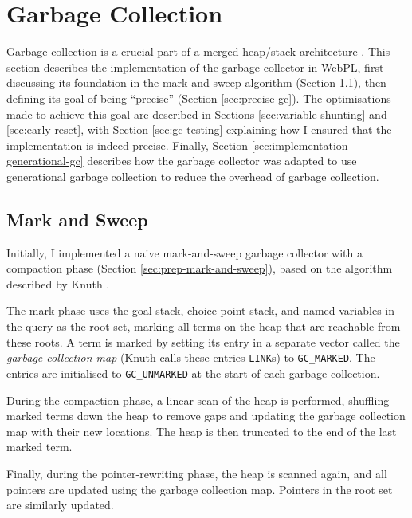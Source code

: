 \section{Garbage Collection}

\label{sec:gc-impl}

Garbage collection is a crucial part of a merged heap/stack architecture \cite{liEfficientMemoryManagement2000}. This section describes the implementation of the garbage collector in WebPL, first discussing its foundation in the mark-and-sweep algorithm (Section \ref{sec:mark-and-sweep}), then defining its goal of being ``precise'' (Section \ref{sec:precise-gc}). The optimisations made to achieve this goal are described in Sections \ref{sec:variable-shunting} and \ref{sec:early-reset}, with Section \ref{sec:gc-testing} explaining how I ensured that the implementation is indeed precise. Finally, Section \ref{sec:implementation-generational-gc} describes how the garbage collector was adapted to use generational garbage collection to reduce the overhead of garbage collection.

\subsection{Mark and Sweep}

\label{sec:mark-and-sweep}

Initially, I implemented a naive mark-and-sweep garbage collector with a compaction phase (Section \ref{sec:prep-mark-and-sweep}), based on the algorithm described by Knuth \cite{knuthArtComputerProgramming1997}.

The mark phase uses the goal stack, choice-point stack, and named variables in the query as the root set, marking all terms on the heap that are reachable from these roots. A term is marked by setting its entry in a separate vector called the \emph{garbage collection map} (Knuth calls these entries \texttt{LINK}s) to \texttt{GC\_MARKED}. The entries are initialised to \texttt{GC\_UNMARKED} at the start of each garbage collection.

During the compaction phase, a linear scan of the heap is performed, shuffling marked terms down the heap to remove gaps and updating the garbage collection map with their new locations. The heap is then truncated to the end of the last marked term.

Finally, during the pointer-rewriting phase, the heap is scanned again, and all pointers are updated using the garbage collection map. Pointers in the root set are similarly updated.

